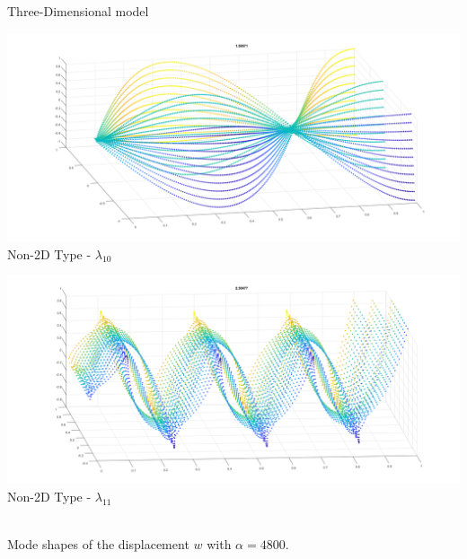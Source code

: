 \documentclass{beamer}
\begin{document}
\begin{frame}{Three-Dimensional model}
    \begin{minipage}[b]{0.45\textwidth}
        \includegraphics[width=\textwidth]{3DNonBeam10.png}
        \\ Non-2D Type - $\lambda_{10}$
        \label{fig:minipage8}
    \end{minipage}
    \hfill
    \begin{minipage}[b]{0.45\textwidth}
        \includegraphics[width=\textwidth]{3DNonBeam11.png}
        \\ Non-2D Type - $\lambda_{11}$
        \label{fig:minipage7}
    \end{minipage}

    \\ Mode shapes of the displacement \( w \) with \( \alpha = 4800 \).
\end{frame}
\end{document}
